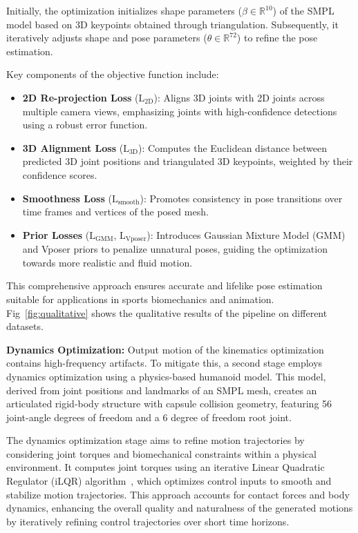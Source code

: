 \documentclass{egpubl}
\begin{document}
Initially, the optimization initializes shape parameters ($\beta \in \mathbb{R}^{10}$) of the SMPL model based on 3D keypoints obtained through triangulation. Subsequently, it iteratively adjusts shape and pose parameters ($\theta \in \mathbb{R}^{72}$) to refine the pose estimation.

Key components of the objective function include:

\begin{itemize}
    \item \textbf{2D Re-projection Loss} ($\mathrm{L}_\text{2D}$): Aligns 3D joints with 2D joints across multiple camera views, emphasizing joints with high-confidence detections using a robust error function.
    \item \textbf{3D Alignment Loss} ($\mathrm{L}_\text{3D}$): Computes the Euclidean distance between predicted 3D joint positions and triangulated 3D keypoints, weighted by their confidence scores.
    \item \textbf{Smoothness Loss} ($\mathrm{L}_\text{smooth}$): Promotes consistency in pose transitions over time frames and vertices of the posed mesh.
    \item \textbf{Prior Losses} ($\mathrm{L}_{\text{GMM}}$, $\mathrm{L}_{\text{Vposer}}$): Introduces Gaussian Mixture Model (GMM) and Vposer priors to penalize unnatural poses, guiding the optimization towards more realistic and fluid motion.
\end{itemize}
 This comprehensive approach ensures accurate and lifelike pose estimation suitable for applications in sports biomechanics and animation. Fig~\ref{fig:qualitative} shows the qualitative results of the pipeline on different datasets.


\textbf{Dynamics Optimization:} Output motion of the kinematics optimization contains high-frequency artifacts. To mitigate this, a second stage employs dynamics optimization using a physics-based humanoid model. This model, derived from joint positions and landmarks of an SMPL mesh, creates an articulated rigid-body structure with capsule collision geometry, featuring 56 joint-angle degrees of freedom and a 6 degree of freedom root joint.

The dynamics optimization stage aims to refine motion trajectories by considering joint torques and biomechanical constraints within a physical environment. It computes joint torques using an iterative Linear Quadratic Regulator (iLQR) algorithm~\cite{howell2022}, which optimizes control inputs to smooth and stabilize motion trajectories. This approach accounts for contact forces and body dynamics, enhancing the overall quality and naturalness of the generated motions by iteratively refining control trajectories over short time horizons.



 
 
\end{document}
